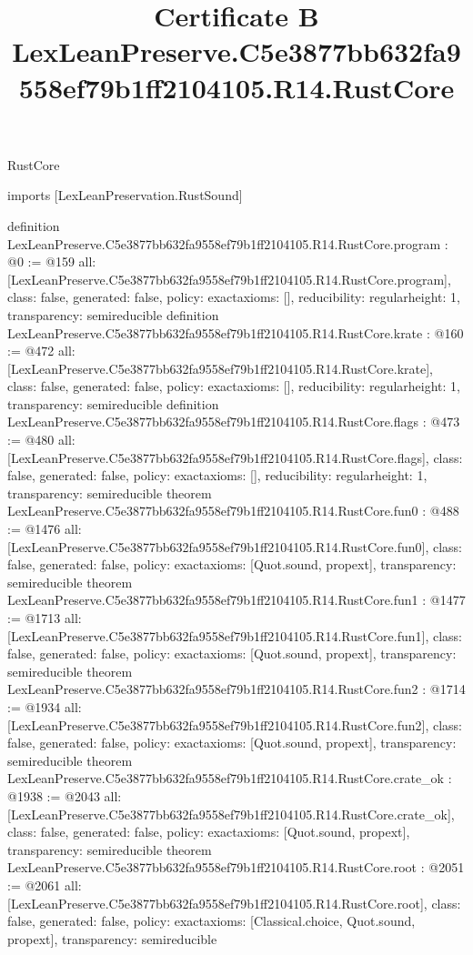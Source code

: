 \begin{lexlean}{RustCore}
\title{Certificate B LexLeanPreserve.C5e3877bb632fa9558ef79b1ff2104105.R14.RustCore}
\begin{coremodule}
imports [LexLeanPreservation.RustSound]

definition LexLeanPreserve.C5e3877bb632fa9558ef79b1ff2104105.R14.RustCore.program : @0 := @159 {
  all: [LexLeanPreserve.C5e3877bb632fa9558ef79b1ff2104105.R14.RustCore.program],
  class: false,
  generated: false,
  policy: exact{axioms: []},
  reducibility: regular{height: 1},
  transparency: semireducible
}
definition LexLeanPreserve.C5e3877bb632fa9558ef79b1ff2104105.R14.RustCore.krate : @160 := @472 {
  all: [LexLeanPreserve.C5e3877bb632fa9558ef79b1ff2104105.R14.RustCore.krate],
  class: false,
  generated: false,
  policy: exact{axioms: []},
  reducibility: regular{height: 1},
  transparency: semireducible
}
definition LexLeanPreserve.C5e3877bb632fa9558ef79b1ff2104105.R14.RustCore.flags : @473 := @480 {
  all: [LexLeanPreserve.C5e3877bb632fa9558ef79b1ff2104105.R14.RustCore.flags],
  class: false,
  generated: false,
  policy: exact{axioms: []},
  reducibility: regular{height: 1},
  transparency: semireducible
}
theorem LexLeanPreserve.C5e3877bb632fa9558ef79b1ff2104105.R14.RustCore.fun0 : @488 := @1476 {
  all: [LexLeanPreserve.C5e3877bb632fa9558ef79b1ff2104105.R14.RustCore.fun0],
  class: false,
  generated: false,
  policy: exact{axioms: [Quot.sound, propext]},
  transparency: semireducible
}
theorem LexLeanPreserve.C5e3877bb632fa9558ef79b1ff2104105.R14.RustCore.fun1 : @1477 := @1713 {
  all: [LexLeanPreserve.C5e3877bb632fa9558ef79b1ff2104105.R14.RustCore.fun1],
  class: false,
  generated: false,
  policy: exact{axioms: [Quot.sound, propext]},
  transparency: semireducible
}
theorem LexLeanPreserve.C5e3877bb632fa9558ef79b1ff2104105.R14.RustCore.fun2 : @1714 := @1934 {
  all: [LexLeanPreserve.C5e3877bb632fa9558ef79b1ff2104105.R14.RustCore.fun2],
  class: false,
  generated: false,
  policy: exact{axioms: [Quot.sound, propext]},
  transparency: semireducible
}
theorem LexLeanPreserve.C5e3877bb632fa9558ef79b1ff2104105.R14.RustCore.crate_ok : @1938 := @2043 {
  all: [LexLeanPreserve.C5e3877bb632fa9558ef79b1ff2104105.R14.RustCore.crate_ok],
  class: false,
  generated: false,
  policy: exact{axioms: [Quot.sound, propext]},
  transparency: semireducible
}
theorem LexLeanPreserve.C5e3877bb632fa9558ef79b1ff2104105.R14.RustCore.root : @2051 := @2061 {
  all: [LexLeanPreserve.C5e3877bb632fa9558ef79b1ff2104105.R14.RustCore.root],
  class: false,
  generated: false,
  policy: exact{axioms: [Classical.choice, Quot.sound, propext]},
  transparency: semireducible
}


\end{coremodule}
\end{lexlean}
